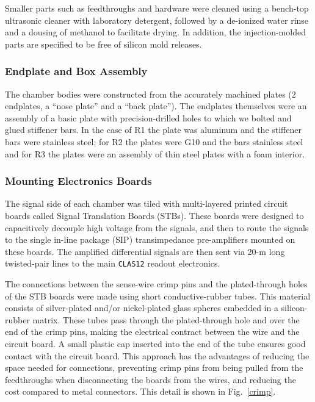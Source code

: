 Smaller parts such as feedthroughs and hardware were cleaned using a 
bench-top ultrasonic cleaner with laboratory detergent, followed by a 
de-ionized water rinse and a dousing of methanol to facilitate drying.  
In addition, the injection-molded parts are specified to be free of silicon 
mold releases.

\subsubsection{Endplate and Box Assembly}


The chamber bodies were constructed from the accurately machined plates
(2 endplates, a ``nose plate'' and a ``back plate'').
The endplates themselves were an assembly of a basic plate with precision-drilled
holes to which we bolted and glued stiffener bars.  In the case of
R1 the plate was aluminum and the stiffener bars were stainless steel;
for R2 the plates were G10 and the bars stainless steel and for R3
the plates were an assembly of thin steel plates with a foam interior.




\subsubsection{Mounting Electronics Boards}

The signal side of each chamber was tiled with multi-layered printed circuit 
boards called Signal Translation Boards (STBs).  These boards were designed 
to capacitively decouple high voltage from the signals, and then to route 
the signals to the single in-line package (SIP) transimpedance pre-amplifiers 
mounted on these boards.  The amplified differential signals are then sent 
via 20-m long twisted-pair lines to the main {\tt CLAS12} readout electronics.

The connections between the sense-wire crimp pins and the plated-through holes 
of the STB boards were made using short conductive-rubber tubes.  This material 
consists of silver-plated and/or nickel-plated glass spheres embedded in a 
silicon-rubber matrix.  These tubes pass through the plated-through hole and 
over the end of the crimp pins, making the electrical contract between the 
wire and the circuit board.  A small plastic cap inserted into the end of the 
tube ensures good contact with the circuit board.  This approach has the 
advantages of reducing the space needed for connections, preventing crimp pins 
from being pulled from the feedthroughs when disconnecting the boards from the 
wires, and reducing the cost compared to metal connectors.  This detail is 
shown in Fig.~\ref{crimp}.

